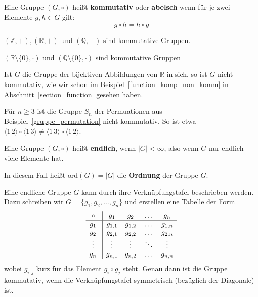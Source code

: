 \begin{definition} Eine Gruppe $(G, \circ)$ heißt \textbf{kommutativ} oder
\textbf{abelsch} wenn für je zwei Elemente $g, h \in G$ gilt:
  $$ g \circ h = h \circ g $$
\end{definition}

\begin{beispiel} $(\mathbb Z, +), (\mathbb R, +)$ und $(\mathbb Q, +)$ sind kommutative Gruppen.

$(\mathbb R \setminus \{0\}, \cdot)$ und $(\mathbb Q  \setminus \{0\}, \cdot)$ sind kommutative Gruppen
\end{beispiel}

\begin{beispiel} Ist $G$ die Gruppe der bijektiven Abbildungen von $\mathbb R$ in sich, 
so ist $G$ nicht kommutativ, wie wir schon im Beispiel~\ref{function_komp_non_komm} 
in Abschnitt~\ref{section_function} gesehen haben.
\end{beispiel}

\begin{beispiel} Für $n \geq 3$ ist die Gruppe $S_n$ der Permuationen 
aus Beispiel~\ref{gruppe_permutation} nicht 
kommutativ. So ist etwa $\langle 1 \, 2 \rangle \circ \langle 1 \, 3 \rangle 
\neq \langle 1 \, 3 \rangle \circ \langle 1 \, 2 \rangle$.
\end{beispiel}

\bigbreak

\begin{definition} Eine Gruppe $(G, \circ)$ heißt 
\textbf{endlich}, wenn $\vert G \vert < \infty$, also 
wenn $G$ nur endlich viele Elemente hat. 

In diesem Fall heißt $\textrm{ord}(G) = \vert G \vert$ die 
\textbf{Ordnung} der Gruppe $G$.
\end{definition}

\begin{notiz} Eine endliche Gruppe $G$ kann durch ihre Verknüpfungstafel beschrieben werden. Dazu 
schreiben wir $G = \{ g_1, g_2, \ldots , g_n \}$ und erstellen eine Tabelle der Form
  $$ \begin{array} { c | c c c c }
  \circ \, & \, g_1 \, & \, g_2 \,  & \, \ldots \, & \, g_n \, \\ \hline
  g_1\, \, & g_{1,1} & g_{1,2} & \ldots & g_{1,n} \\
  g_2\, \, & g_{2,1} & g_{2,2} & \ldots & g_{2,n} \\
  \vdots\, \, & \vdots & \vdots & \ddots & \vdots \\
  g_n\, \, & g_{n,1} & g_{n,2} & \ldots & g_{n,n} 
  \end{array} $$
wobei $g_{i,j}$ kurz für das Element $g_i \circ g_j$ steht. Genau dann ist die Gruppe kommutativ, wenn 
die Verknüpfungstafel symmetrisch (bezüglich der Diagonale) ist.
\end{notiz}

